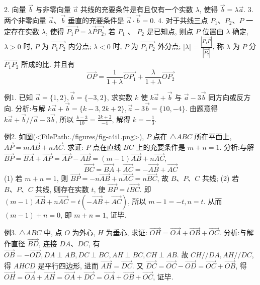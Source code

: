 2. 向量 $\vec{b}$ 与非零向量 $\vec{a}$ 共线的充要条件是有且仅有一个实数 $\lambda$, 使得 $\vec{b}=\lambda \vec{a}$.
3. 两个非零向量 $\vec{a} 、 \vec{b}$ 垂直的充要条件是 $\vec{a} \cdot \vec{b}=0$.
4. 对于共线三点 $P_1 、 P_2 、 P$ 一定存在实数 $\lambda$, 使得 $\overrightarrow{P_1 P}=\lambda \vec{P} \overrightarrow{P_2}$, 若 $P_1$ 、 $P_2$ 是已知点, 则点 $P$ 位置由 $\lambda$ 确定, $\lambda>0$ 时, $P$ 为 $\overrightarrow{P_1 P_2}$ 内分点; $\lambda<0$ 时, $P$ 为 $\overrightarrow{P_1 P_2}$ 外分点; $|\lambda|=\frac{\left|\overrightarrow{P_1 P}\right|}{\left|\overrightarrow{P_2}\right|}$, 称 $\lambda$ 为 $P$ 分 $\overrightarrow{P_1 P_2}$ 所成的比.
并且有
$$
\overrightarrow{O P}=\frac{1}{1+\lambda} \overrightarrow{O P_1}+\frac{\lambda}{1+\lambda} \overrightarrow{O P_2}
$$



例1. 已知 $\vec{a}=\{1,2\}, \vec{b}=\{-3,2\}$, 求实数 $k$ 使 $k \vec{a}+\vec{b}$ 与 $\vec{a}-3 \vec{b}$ 同方向或反方向.
分析:与解 $k \vec{a}+\vec{b}=\{k-3,2 k+2\}, \vec{a}-3 \vec{b}=\{10,-4\}$.
由题意得 $k \vec{a}+\vec{b} / / \vec{a}-3 \vec{b}$, 所以 $\frac{k-3}{10}=\frac{2 k+2}{-4}$, 解得 $k=-\frac{1}{3}$.



例2. 如图(<FilePath:./figures/fig-c4i1.png>), $P$ 点在 $\triangle A B C$ 所在平面上, $\overrightarrow{A P}=m \overrightarrow{A B}+n \overrightarrow{A C}$. 求证: $P$ 点在直线 $B C$ 上的充要条件是 $m+n=1$.
分析:与解 $\overrightarrow{B P}=\overrightarrow{B A}+\overrightarrow{A P}=\overrightarrow{A P}-\overrightarrow{A B}= (m-1) \overrightarrow{A B}+n \overrightarrow{A C}$,
$$
\overrightarrow{B C}=\overrightarrow{B A}+\overrightarrow{A C}=-\overrightarrow{A B}+\overrightarrow{A C}
$$
(1) 若 $m+n=1$, 则 $\overrightarrow{B P}=-n \overrightarrow{A B}+n \overrightarrow{A C}=n \overrightarrow{B C}$, 故 $B 、 P 、 C$ 共线;
(2) 若 $B 、 P 、 C$ 共线, 则存在实数 $t$, 使 $\overrightarrow{B P}=t \overrightarrow{B C}$.
即 $(m-1) \overrightarrow{A B}+n \overrightarrow{A C}=t(-\overrightarrow{A B}+\overrightarrow{A C})$, 所以 $m-1=-t, n=t$.
从而 $(m-1)+n=0$, 即 $m+n=1$, 证毕.



例3. $ \triangle A B C$ 中, 点 $O$ 为外心, $H$ 为垂心, 求证: $\overrightarrow{O H}=\overrightarrow{O A}+\overrightarrow{O B}+\overrightarrow{O C}$.
分析:与解作直径 $\overrightarrow{B D}$, 连接 $D A 、 D C$, 有 $\overrightarrow{O B}=-\overrightarrow{O D}, D A \perp A B, D C \perp B C, A H \perp B C, C H \perp A B$.
故 $C H / / D A, A H / / D C$, 得 $A H C D$ 是平行四边形, 进而 $\overrightarrow{A H}=\overrightarrow{D C}$.
又 $\overrightarrow{D C}=\overrightarrow{O C}-\overrightarrow{O D}=\overrightarrow{O C}+\overrightarrow{O B}$, 得 $\overrightarrow{O H}=\overrightarrow{O A}+\overrightarrow{A H}=\overrightarrow{O A}+\overrightarrow{D C}=\overrightarrow{O A}+ \overrightarrow{O B}+\overrightarrow{O C}$, 证毕.



